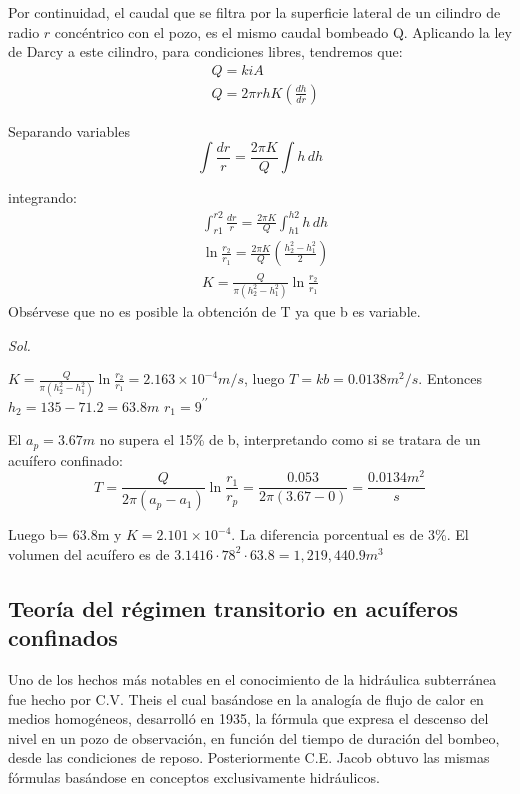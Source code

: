Por continuidad, el caudal que se filtra por la superficie lateral de un cilindro de radio $r$ concéntrico con el pozo, es el mismo caudal bombeado Q. Aplicando la ley de Darcy a este cilindro, para condiciones libres, tendremos que:
\begin{align*}
    &Q= kiA\\
    &Q= 2\pi r h K\left(\frac{dh}{dr}\right)
\end{align*}

Separando variables
\begin{equation*}
    \int \frac{dr}{r}= \frac{2\pi K}{Q} \int h \, dh
\end{equation*}

integrando:
\begin{align*}
    &\int_{r1}^{r2} \frac{dr}{r} = \frac{2\pi K}{Q} \int_{h1}^{h2} h\,dh\\ 
    &\ln{\frac{r_2}{r_1}} = \frac{2\pi K}{Q} \left(\frac{h^2_2 - h^2_1 }{2}\right)\\
    &K = \frac{Q}{\pi\left(h^2_2 - h^2_1\right)} \ln{\frac{r_2}{r_1}}
\end{align*}
Obsérvese que no es posible la obtención de T ya que b es variable. 

\begin{problem}
    
\textit{ Sol. }

$K=\frac{Q}{\pi\left(h^2_2- h^2_1\right)} \ln{\frac{r_2}{r_1}}= 2.163\times 10^{-4} m/s$, luego $T=kb=0.0138 m^2/s$. Entonces $h_2= 135-71.2= 63.8m$ $r_1=9^{\prime\prime}$

El $a_p= 3.67m$ no supera el 15\% de b, interpretando como si se tratara de un acuífero confinado:
\begin{equation*}
    T = \frac{Q}{2\pi \left(a_p - a_1 \right)} \ln{\frac{r_1}{r_p}}= \frac{0.053}{2\pi \left(3.67 - 0\right)} = \frac{0.0134m^2}{s}
\end{equation*}

Luego b= 63.8m y $K= 2.101\times 10^{-4}$. La diferencia porcentual es de 3\%. El volumen del acuífero es de $ 3.1416\cdot 78^2\cdot 63.8= 1,219,440.9m^3$
\end{problem}

\subsection{Teoría del régimen transitorio en acuíferos confinados}
Uno de los hechos más notables en el conocimiento de la hidráulica subterránea fue hecho por C.V. Theis el cual basándose en la analogía de flujo de calor en medios homogéneos, desarrolló en 1935, la fórmula que expresa el descenso del nivel en un pozo de observación, en función del tiempo de duración del bombeo, desde las condiciones de reposo. Posteriormente C.E. Jacob obtuvo las mismas fórmulas basándose  en conceptos exclusivamente hidráulicos.

